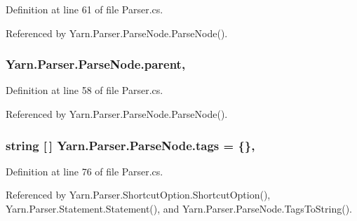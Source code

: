 Definition at line 61 of file Parser.\-cs.



Referenced by Yarn.\-Parser.\-Parse\-Node.\-Parse\-Node().

\hypertarget{a00138_af313a82103fcc2ff5a177dbb06b92f7b}{
\subsubsection[{parent}]{ Yarn.\-Parser.\-Parse\-Node.\-parent\hspace{0.3cm}{\ttfamily [package]}, {\ttfamily [inherited]}}}\label{a00138_af313a82103fcc2ff5a177dbb06b92f7b}


Definition at line 58 of file Parser.\-cs.



Referenced by Yarn.\-Parser.\-Parse\-Node.\-Parse\-Node().

\hypertarget{a00138_a58b3a15788fd2d4127d73619dc6d04ae}{
\subsubsection[{tags}]{\setlength{\rightskip}{0pt plus 5cm}string \mbox{[}$\,$\mbox{]} Yarn.\-Parser.\-Parse\-Node.\-tags = \{\}\hspace{0.3cm}{\ttfamily [package]}, {\ttfamily [inherited]}}}\label{a00138_a58b3a15788fd2d4127d73619dc6d04ae}


Definition at line 76 of file Parser.\-cs.



Referenced by Yarn.\-Parser.\-Shortcut\-Option.\-Shortcut\-Option(), Yarn.\-Parser.\-Statement.\-Statement(), and Yarn.\-Parser.\-Parse\-Node.\-Tags\-To\-String().

